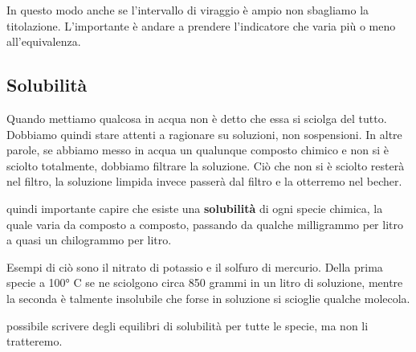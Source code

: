 In questo modo anche se l'intervallo di viraggio è ampio non sbagliamo la titolazione. L'importante è andare a prendere l'indicatore che varia più o meno all'equivalenza.

\subsection{Solubilità}
Quando mettiamo qualcosa in acqua non è detto che essa si sciolga del tutto. Dobbiamo quindi stare attenti a ragionare su soluzioni, non sospensioni. In altre parole, se abbiamo messo in acqua un qualunque composto chimico e non si è sciolto totalmente, dobbiamo filtrare la soluzione. Ciò che non si è sciolto resterà nel filtro, la soluzione limpida invece passerà dal filtro e la otterremo nel becher.

\E quindi importante capire che esiste una \textbf{solubilità} di ogni specie chimica, la quale varia da composto a composto, passando da qualche milligrammo per litro a quasi un chilogrammo per litro.

Esempi di ciò sono il nitrato di potassio e il solfuro di mercurio. Della prima specie a 100° C se ne sciolgono circa 850 grammi in un litro di soluzione, mentre la seconda è talmente insolubile che forse in soluzione si scioglie qualche molecola.

\E possibile scrivere degli equilibri di solubilità per tutte le specie, ma non li tratteremo.